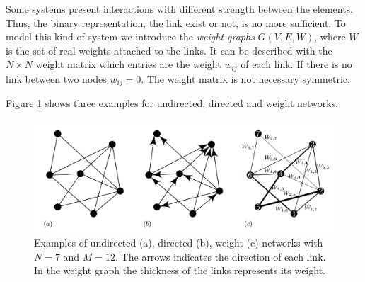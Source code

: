 Some systems present interactions with different strength between the elements. Thus, the binary representation, the link exist or not, is no more sufficient. To model this kind of system we introduce the \textit{weight graphs} $G(V,E,W)$, where $W$ is the set of real weights attached to the links.   
It can be described with the $N\times N$ weight matrix which entries are the weight $w_{ij}$ of each link. If there is no link between two nodes $w_{ij} = 0$. The weight matrix is not necessary symmetric. 

Figure \ref{fig:weight_graphs} shows three examples for undirected, directed and weight networks.
\begin{figure}[ht!]
    \centering
    \includegraphics[scale=0.45]{image/weight_graphs.png}
    \caption{Examples of undirected (a), directed (b), weight (c) networks with $N=7$ and $M=12$. The arrows indicates the direction of each link. In the weight graph the thickness of the links represents its weight.}
    \label{fig:weight_graphs}
\end{figure}






